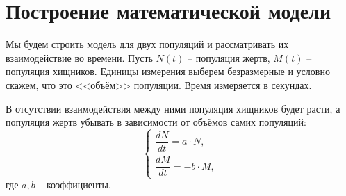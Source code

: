 \section{Построение математической модели}
    Мы будем строить модель для двух популяций и рассматривать их взаимодействие во времени. Пусть $ N(t) $ -- популяция жертв, $ M(t) $ -- популяция хищников. Единицы измерения выберем безразмерные и условно скажем, что это <<объём>> популяции. Время измеряется в секундах.

    В отсутствии взаимодействия между ними популяция хищников будет расти, а популяция жертв убывать в зависимости от объёмов самих популяций:
    \[
        \begin{cases}
            \dfrac{dN}{dt} = a \cdot N, \\[.5em]
            \dfrac{dM}{dt} = -b \cdot M,
        \end{cases}
    \]
    где $a, b$ -- коэффициенты.